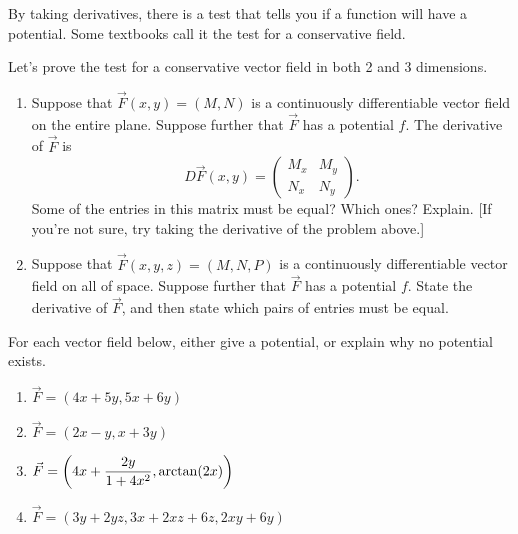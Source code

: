 {By taking derivatives, there is a test that tells you if a function will have a potential. Some textbooks call it the test for a conservative field.  
\begin{problem}
Let's prove the test for a conservative vector field in both 2 and 3 dimensions.
\begin{enumerate}
 \item  Suppose that $\vec F(x,y)=(M,N)$ is a continuously differentiable vector field on the entire plane.  Suppose further that $\vec F$ has a potential $f$.  The derivative of $\vec F$ is $$D\vec F(x,y) = 
\begin{pmatrix}
M_x&M_y\\
N_x&N_y                                                                                                                                                                                \end{pmatrix}.
$$
Some of the entries in this matrix must be equal?  Which ones? Explain. [If you're not sure, try taking the derivative of the problem above.]

\item Suppose that $\vec F(x,y,z)=(M,N,P)$ is a continuously differentiable vector field on all of space.  Suppose further that $\vec F$ has a potential $f$.  State the derivative of $\vec F$, and then state which pairs of entries must be equal. 
\end{enumerate}
\end{problem}


\begin{problem}
For each vector field below, either give a potential, or explain why no potential exists.
\begin{enumerate}
 \item $\vec F=(4x+5y,5x+6y)$
 \item $\vec F= (2x-y,x+3y)$
 \item $\displaystyle\vec F= \left(4x+\frac{2y}{1+4x^2},\arctan(2x)\right)$
 \item $\vec F= (3y+2yz, 3x+2xz+6z,2xy+6y)$ 
\end{enumerate}
\end{problem}


}
